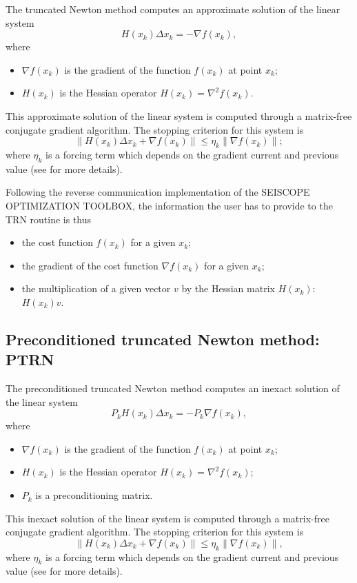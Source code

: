 \documentclass[a4paper,twoside,final,onecolumn,11pt,openright]{article}
\begin{document}
The truncated Newton method computes an approximate solution of the linear system
\begin{equation}
 H(x_k)\Delta x_k=-\nabla f(x_k),
\end{equation}
where 
\begin{itemize}
 \item $\nabla f(x_k)$ is the gradient of the function $f(x_k)$ at point $x_k$;
 \item $H(x_k)$ is the Hessian operator $H(x_k)=\nabla^2 f(x_k)$.
\end{itemize}
This approximate solution of the linear system is computed through a matrix-free conjugate gradient algorithm. The stopping criterion for this system is
\begin{equation}
\|H(x_k)\Delta x_k+\nabla f(x_k)\|\leq \eta_k \|\nabla f(x_k)\|;
\end{equation}
where $\eta_k$ is a forcing term which depends on the gradient current and previous value (see \citet{Eisenstat_1994_TRN,Metivier_2013_TRU} for more details). 

Following the reverse communication implementation of the SEISCOPE OPTIMIZATION TOOLBOX, the information the user has to provide to the TRN routine is thus 
\begin{itemize}
 \item the cost function $f(x_k)$ for  a given $x_k$;
 \item the gradient of the cost function $\nabla f(x_k)$ for  a given $x_k$;
 \item the multiplication of a given vector $v$ by the Hessian matrix $H(x_k)$: $H(x_k)v$.
\end{itemize}

\subsection{Preconditioned truncated Newton method: PTRN}

The preconditioned truncated Newton method computes an inexact solution of the linear system
\begin{equation}
 P_kH(x_k)\Delta x_k=-P_k \nabla f(x_k),
\end{equation}
where 
\begin{itemize}
 \item $\nabla f(x_k)$ is the gradient of the function $f(x_k)$ at point $x_k$;
 \item $H(x_k)$ is the Hessian operator $H(x_k)=\nabla^2 f(x_k)$;
\item $P_k$ is a preconditioning matrix.
\end{itemize}
This inexact solution of the linear system is computed through a matrix-free conjugate gradient algorithm. The stopping criterion for this system is
\begin{equation}
\|H(x_k)\Delta x_k+\nabla f(x_k)\|\leq \eta_k \|\nabla f(x_k)\|,
\end{equation}
where $\eta_k$ is a forcing term which depends on the gradient current and previous value (see \citet{Eisenstat_1994_TRN,Metivier_2013_TRU} for more details). 
\end{document}

